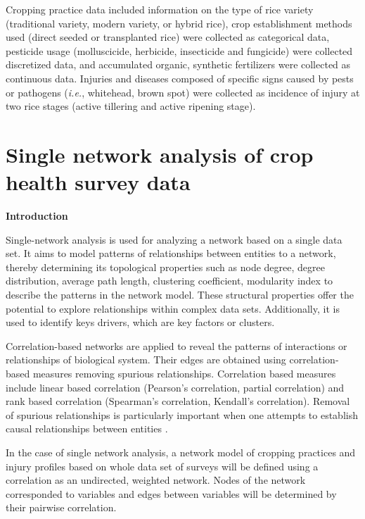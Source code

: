 Cropping practice data included information on the type of rice variety (traditional variety, modern variety, or hybrid rice), crop establishment methods used (direct seeded or transplanted rice) were collected as categorical data, pesticide usage (molluscicide, herbicide, insecticide and fungicide) were collected discretized data, and accumulated organic, synthetic fertilizers were collected as continuous data. Injuries and diseases composed of specific signs caused by pests or pathogens (\textit{i.e.}, whitehead, brown spot) were collected as incidence of injury at two rice stages (active tillering and active ripening stage).


\section*{Single network analysis of crop health survey data}
\textbf{Introduction}

Single-network analysis is used for analyzing a network based on a single data set. It aims to model patterns of relationships between entities to a network, thereby determining its topological properties such as node degree, degree distribution, average path length, clustering coefficient, modularity index  to describe the patterns in the network model. These structural properties offer the potential to explore relationships within complex data sets. Additionally, it is used to identify keys drivers, which are key factors or clusters.

Correlation-based networks are applied to reveal the patterns of interactions or relationships of biological system. Their edges are obtained using correlation-based measures removing spurious relationships. Correlation based measures include linear based correlation (Pearson's correlation, partial correlation) and rank based correlation (Spearman's correlation, Kendall's correlation). Removal of spurious relationships is particularly important when one attempts to establish causal relationships between entities .

In the case of single network analysis, a network model of cropping practices and injury profiles based on whole data set of surveys will be defined using a correlation as an undirected, weighted network. Nodes of the network corresponded to variables and edges between variables will be determined by their pairwise correlation.

